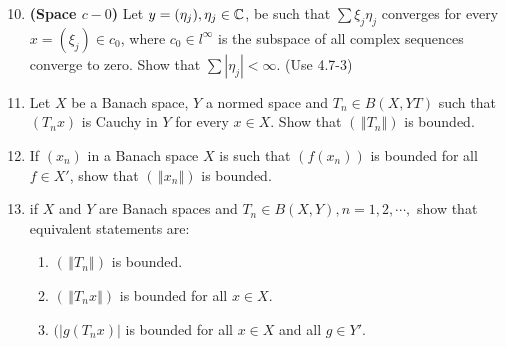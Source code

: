 \documentclass[10pt,a4paper]{report}
\newcommand{\NORM}[1]{\,\left \Vert #1 \right \Vert}
\begin{document}
\begin{enumerate}
	\setcounter{enumi}{9}
	\item \textbf{(Space $c-0$)}  Let $y=(\eta_j), \eta_j \in \mathbb{C}$, be such that $\sum  \xi_j\eta_j$ converges for every $x=(\xi_j)\in c_0$, where $c_0\in l^\infty$ is the subspace of all complex sequences converge to zero. Show that $\sum |\eta_j|< \infty$.  (Use 4.7-3)
	
	\item Let $X$ be a Banach space, $Y$ a normed space and $T_n\in B(X,YT)$ such that $(T_nx)$ is Cauchy in $Y$ for every $x \in X$.  Show that $(\NORM{T_n})$ is bounded.
	
	\setcounter{enumi}{12}
	\item  If $(x_n)$ in a Banach space $X$ is such that $(f(x_n))$ is bounded for all $ f\in X'$, show that $(\NORM{x_n})$ is bounded.
	\item if $X$ and $Y$ are Banach spaces and $T_n\in B(X,Y), n=1,2,\cdots,$ show that equivalent statements are:
	\begin{enumerate}
		\item $(\NORM{T_n})$ is bounded.
		\item $(\NORM{T_nx})$ is bounded for all $x \in X$.
		\item $(|g(T_nx)|$ is bounded for all $x\in X$ and all $g \in Y'$.
	\end{enumerate}
\end{enumerate}
\end{document}
